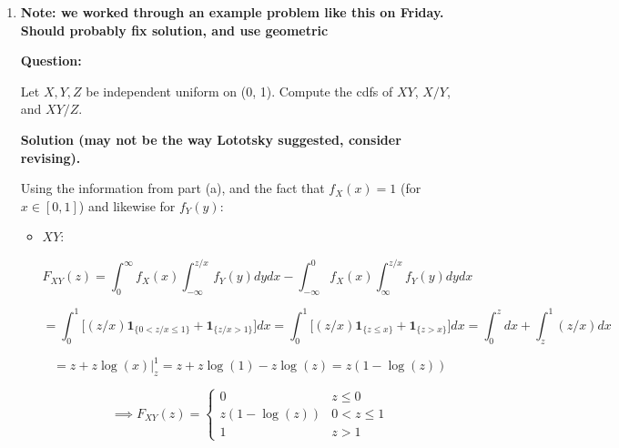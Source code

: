 \begin{enumerate}[(1)]

\item


\textbf{Note: we worked through an example problem like this on Friday. Should probably fix solution, and use geometric}

\textbf{Question:} 

Let \(X, Y, Z\) be independent uniform on (0, 1). Compute the cdfs of \(XY\), \(X/Y\), and \(XY/Z\). 

\textbf{Solution (may not be the way Lototsky suggested, consider revising).}



Using the information from part (a), and the fact that \(f_X(x) = 1\) (for \(x \in [0, 1]\)) and likewise for \(f_Y(y)\):

\begin{itemize}

\item \(XY\):

\[
F_{XY}(z) = \int_0^\infty f_X(x) \int_{-\infty}^{z/x} f_Y(y) dy dx - \int_{-\infty}^0 f_X(x) \int_{\infty}^ {z/x} f_Y(y) dy dx
\]

\[
= \int_0^1  \big[ (z/x) \boldsymbol{1}_{\{0 < z/x \leq 1\}} + \boldsymbol{1}_{\{z/x > 1\}} \big] dx = \int_0^1  \big[ (z/x) \boldsymbol{1}_{\{z \leq x\}} + \boldsymbol{1}_{\{z > x\}} \big] dx = \int_0^z dx + \int_z^1 (z/x) dx
\]

\[
=z + z \log(x) \big|_z^1 = z + z \log(1) - z \log(z) = z (1 - \log(z))
\]

\[
\implies \boxed{ F_{XY}(z) =  \begin{cases} 
     0   &  z \leq 0 \\
     z (1 - \log(z)) & 0 < z \leq 1 \\
   1 & z > 1\end{cases}}
\]


\end{itemize}
\end{enumerate}
